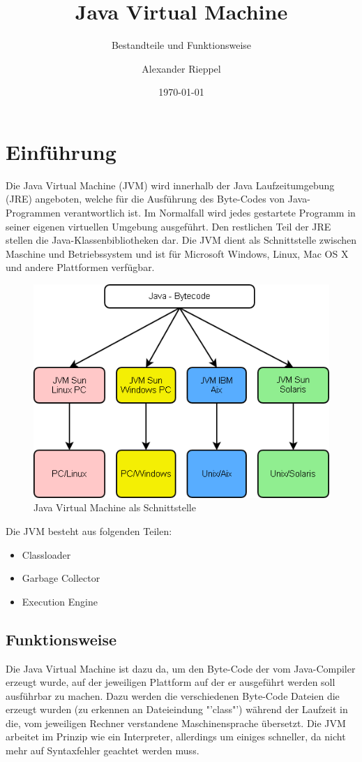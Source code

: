 \documentclass[a4paper,14pt]{scrreprt}
\begin{document}
\author{Alexander Rieppel} %
\title{Java Virtual Machine} %
\subject{FT-Ausarbeitung} %
\subtitle{Bestandteile und Funktionsweise} %
\date{\today} %
\publishers{5AHITT} %

\maketitle
\tableofcontents
 

\chapter{Einführung}
Die Java Virtual Machine (JVM) wird innerhalb der Java Laufzeitumgebung (JRE) angeboten, welche für die Ausführung des Byte-Codes von Java-Programmen verantwortlich ist. Im Normalfall wird jedes gestartete Programm in seiner eigenen virtuellen Umgebung ausgeführt. Den restlichen Teil der JRE stellen die Java-Klassenbibliotheken dar. Die JVM dient als Schnittstelle zwischen Maschine und Betriebssystem und ist für Microsoft Windows, Linux, Mac OS X und andere  Plattformen verfügbar. 
\begin{figure}[h!]
\centering
\includegraphics[width=0.8\linewidth]{./Java-jvm}
\caption[Java Virtual Machine als Schnittstelle]{Java Virtual Machine als Schnittstelle}
\label{fig:Java-jvm}
\end{figure}\newpage
Die JVM besteht aus folgenden Teilen:
\begin{itemize}
\item Classloader
\item Garbage Collector
\item Execution Engine
\end{itemize}
\section{Funktionsweise}
Die Java Virtual Machine ist dazu da, um den Byte-Code der vom Java-Compiler erzeugt wurde, auf der jeweiligen Plattform auf der er ausgeführt werden soll ausführbar zu machen. Dazu werden die verschiedenen Byte-Code Dateien die erzeugt wurden (zu erkennen an Dateieindung "'class"') während der Laufzeit in die, vom jeweiligen Rechner verstandene Maschinensprache übersetzt. Die JVM arbeitet im Prinzip wie ein Interpreter, allerdings um einiges schneller, da nicht mehr auf Syntaxfehler geachtet werden muss. 
\end{document}
